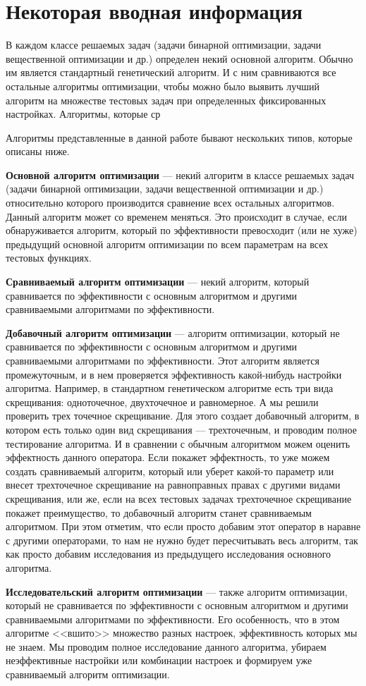\section{Некоторая вводная информация}\label{HarrixOptimizationAlgorithms:first_informamtion}

В каждом классе решаемых задач (задачи бинарной оптимизации, задачи вещественной оптимизации и др.) определен некий основной алгоритм. Обычно им является стандартный генетический алгоритм. И с ним сравниваются все остальные алгоритмы оптимизации, чтобы можно было выявить лучший алгоритм на множестве тестовых задач при определенных фиксированных настройках. Алгоритмы, которые ср

Алгоритмы представленные в данной работе бывают нескольких типов, которые описаны ниже. 

\textbf{Основной алгоритм оптимизации} --- некий алгоритм в классе решаемых задач (задачи бинарной оптимизации, задачи вещественной оптимизации и др.) относительно которого производится сравнение всех остальных алгоритмов. Данный алгоритм может со временем меняться. Это происходит в случае, если обнаруживается алгоритм, который по эффективности превосходит (или не хуже) предыдущий основной алгоритм оптимизации по всем параметрам на всех тестовых функциях.

\textbf{Сравниваемый алгоритм оптимизации} ---  некий алгоритм, который сравнивается по эффективности с основным алгоритмом и другими сравниваемыми алгоритмами по эффективности.

\textbf{Добавочный алгоритм оптимизации} --- алгоритм оптимизации, который не сравнивается по эффективности с основным алгоритмом и другими сравниваемыми алгоритмами по эффективности. Этот алгоритм является промежуточным, и в нем проверяется эффективность какой-нибудь настройки алгоритма. Например, в стандартном генетическом алгоритме есть три вида скрещивания: одноточечное, двухточечное и равномерное. А мы решили проверить трех точечное скрещивание. Для этого создает добавочный алгоритм, в котором есть только один вид скрещивания --- трехточечным, и проводим полное тестирование алгоритма. И в сравнении с обычным алгоритмом можем оценить  эффектность данного оператора. Если покажет эффектность, то уже можем создать сравниваемый алгоритм, который или уберет какой-то параметр или внесет трехточечное скрещивание на равноправных правах с другими видами скрещивания, или же, если на всех тестовых задачах трехточечное скрещивание покажет преимущество, то добавочный алгоритм станет сравниваемым алгоритмом. При этом отметим, что если просто добавим этот оператор в наравне с другими операторами, то нам не нужно будет пересчитывать весь алгоритм, так как просто добавим исследования из предыдущего исследования основного алгоритма.

\textbf{Исследовательский алгоритм оптимизации} --- также алгоритм оптимизации, который не сравнивается по эффективности с основным алгоритмом и другими сравниваемыми алгоритмами по эффективности. Его особенность, что в этом алгоритме <<вшито>> множество разных настроек, эффективность которых мы не знаем. Мы проводим полное исследование данного алгоритма, убираем неэффективные настройки или комбинации настроек и формируем уже сравниваемый алгоритм оптимизации.